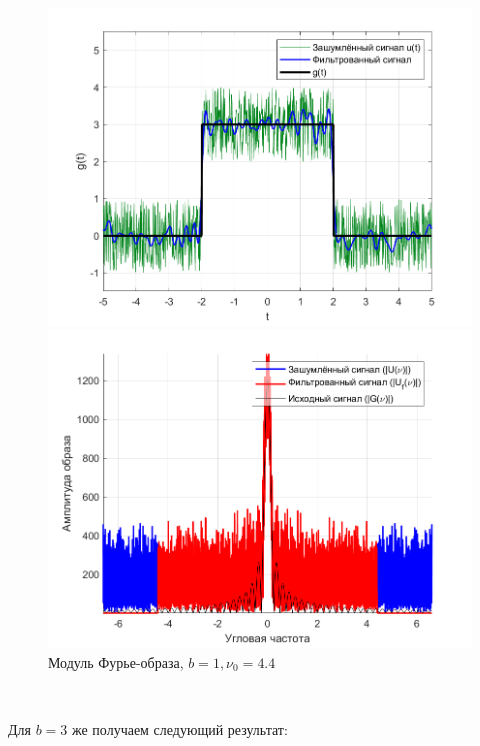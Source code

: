 \documentclass[a4paper]{article}
\begin{document}
\begin{figure}[H]
    \begin{minipage}{0.5\textwidth}
        \centering
        \includegraphics[width=\textwidth]{part1/1_4.4.png}
        \caption{$b=1, \nu_0 = 4.4$}
    \end{minipage}    
    \begin{minipage}{0.5\textwidth}
        \centering
        \includegraphics[width=\textwidth]{part1/1_4.4_Fourier.png}
        \caption{Модуль Фурье-образа, $b=1, \nu_0 = 4.4$}
    \end{minipage}
\end{figure}\

Для $b = 3$ же получаем следующий результат:
\end{document}
